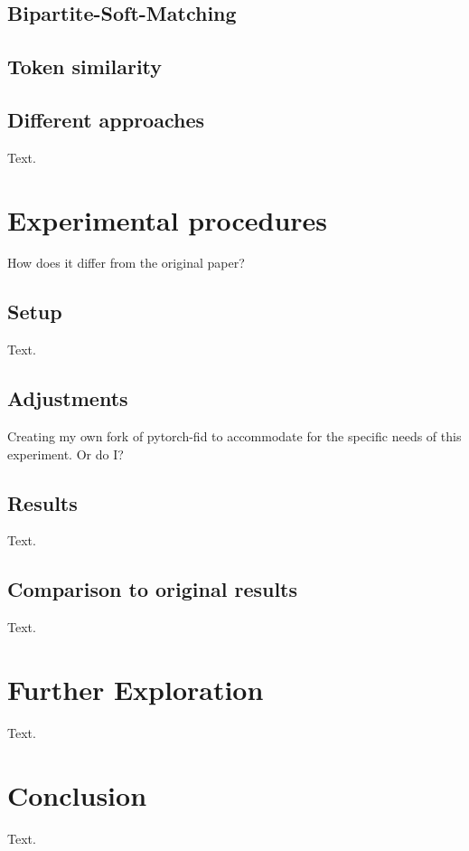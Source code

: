 \documentclass{article}
\begin{document}
\subsection{Bipartite-Soft-Matching}


\subsection{Token similarity}

\subsection{Different approaches}
Text.





\newpage
\section{Experimental procedures}
How does it differ from the original paper?

\subsection{Setup}
Text.

\subsection{Adjustments}
Creating my own fork of pytorch-fid \cite{Seitzer2020FID} to accommodate for the specific needs of this experiment. Or do I?

\subsection{Results}
Text.

\subsection{Comparison to original results}
Text.




\newpage
\section{Further Exploration}
Text.




\newpage
\section{Conclusion}
Text.





\newpage


\end{document}
